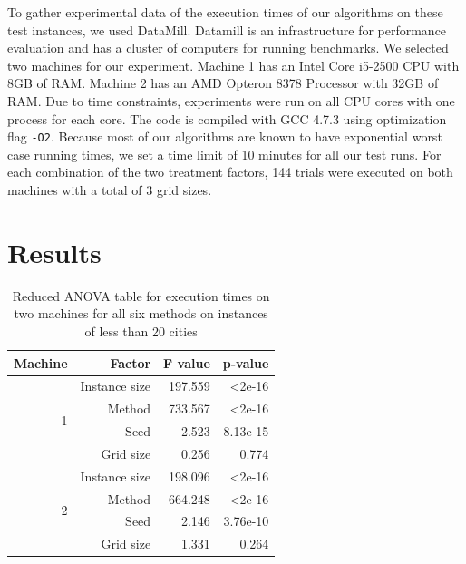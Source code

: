 \documentclass[11pt]{article}
\begin{document}
	To gather experimental data of the execution times of our algorithms on these test instances, we used DataMill. Datamill is an infrastructure for performance evaluation and has a cluster of computers for running benchmarks. We selected two machines for our experiment. Machine 1 has an Intel Core i5-2500 CPU with 8GB of RAM. Machine 2 has an AMD Opteron 8378 Processor with 32GB of RAM. Due to time constraints, experiments were run on all CPU cores with one process for each core. The code is compiled with GCC 4.7.3 using optimization flag \texttt{-O2}. Because most of our algorithms are known to have exponential worst case running times, we set a time limit of 10 minutes for all our test runs. For each combination of the two treatment factors, 144 trials were executed on both machines with a total of 3 grid sizes. 
	
	\section{Results}
	\begin{table}
	\centering
	\begin{tabular}{r|r|rr}
		Machine & Factor & F value & p-value  \\
		\hline
		\hline
		\multirow{4}{*}{1} 
		& Instance size             & 197.559 & \textless 2e-16 \\
		& Method             & 733.567 & \textless 2e-16 \\
		\cline{2-4}
		& Seed            & 2.523 & 8.13e-15 \\
		& Grid size & 0.256 & 0.774 \\
		\hline
		\multirow{4}{*}{2}
		& Instance size             & 198.096 & \textless 2e-16 \\
		& Method             & 664.248 & \textless 2e-16 \\
		\cline{2-4}
		& Seed            & 2.146 & 3.76e-10 \\
		& Grid size & 1.331 & 0.264 \\
	\end{tabular}
	\caption{Reduced ANOVA table for execution times on two machines for all six methods on instances of less than 20 cities}
	\label{tab:runtime_small_anova}
\end{table}
	
\end{document}
